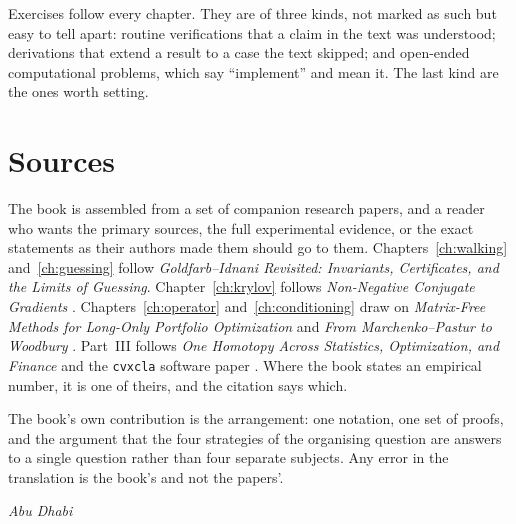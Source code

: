 Exercises follow every chapter. They are of three kinds, not marked as such but
easy to tell apart: routine verifications that a claim in the text was
understood; derivations that extend a result to a case the text skipped; and
open-ended computational problems, which say ``implement'' and mean it. The last
kind are the ones worth setting.

\section*{Sources}

The book is assembled from a set of companion research papers, and a reader who
wants the primary sources, the full experimental evidence, or the exact
statements as their authors made them should go to them.
Chapters~\ref{ch:walking} and~\ref{ch:guessing} follow \emph{Goldfarb--Idnani
Revisited: Invariants, Certificates, and the Limits of Guessing}.
Chapter~\ref{ch:krylov} follows \emph{Non-Negative Conjugate Gradients}
\cite{schmelzer2026nncg}. Chapters~\ref{ch:operator} and~\ref{ch:conditioning}
draw on \emph{Matrix-Free Methods for Long-Only Portfolio Optimization}
\cite{schmelzer2026matrixfree} and \emph{From Marchenko--Pastur to Woodbury}
\cite{schmelzer2026rmt}. Part~III follows \emph{One Homotopy Across Statistics,
Optimization, and Finance} \cite{schmelzer2026perspective} and the \texttt{cvxcla}
software paper \cite{cvxcla}. Where the book states an empirical number, it is
one of theirs, and the citation says which.

The book's own contribution is the arrangement: one notation, one set of proofs,
and the argument that the four strategies of the organising question are answers
to a single question rather than four separate subjects. Any error in the
translation is the book's and not the papers'.

\bigskip
\noindent\emph{Abu Dhabi}
